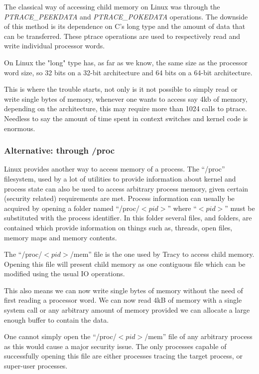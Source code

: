 \documentclass[a4paper, 10pt]{report}
\begin{document}
The classical way of accessing child memory on Linux was through the
\textit{PTRACE\_PEEKDATA} and \textit{PTRACE\_POKEDATA} operations.
The downside of this method is its dependence on C's long type and the
amount of data that can be transferred.
These ptrace operations are used to respectively read and write individual
processor words.

On Linux the "long" type has, as far as we know, the same size as the
processor word size, so 32 bits on a 32-bit architecture and
64 bits on a 64-bit architecture.

This is where the trouble starts, not only is it not possible to simply read
or write single bytes of memory, whenever one wants to access say 4kb of
memory, depending on the architecture, this may require more than 1024
calls to ptrace. Needless to say the amount of time spent in context switches
and kernel code is enormous.

\subsubsection{Alternative: through /proc}
Linux provides another way to access memory of a process. The ``/proc''
filesystem, used by a lot of utilities to provide information about kernel
and process state can also be used to access arbitrary process memory,
given certain (security related) requirements are met.
Process information can usually be acquired by opening a folder
named ``/proc/$<pid>$'' where ``$<pid>$'' must be substituted with the process
identifier. In this folder several files, and folders, are contained which
provide information on things such as, threads, open files, memory maps and
memory contents.

The ``/proc/$<pid>$/mem'' file is the one used by Tracy to access child memory.
Opening this file will present child memory as one contiguous file which
can be modified using the usual IO operations.

This also means we can now write single bytes of memory without the need
of first reading a processor word. We can now read 4kB of memory with a
single system call or any arbitrary amount of memory provided we can allocate
a large enough buffer to contain the data.

One cannot simply open the ``/proc/$<pid>$/mem'' file of any
arbitrary process as this would cause a major security issue. The only
processes capable of successfully opening this file are either processes
tracing the target process, or super-user processes.
\end{document}
